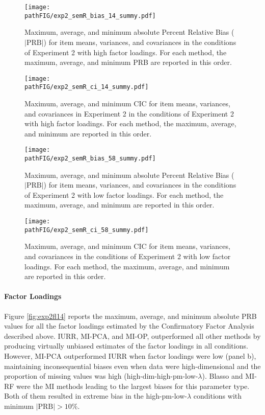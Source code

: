 \begin{figure}
	\texttt{[image: \\pathFIG/exp2\_semR\_bias\_14\_summy.pdf]}
\caption{
	Maximum, average, and minimum absolute Percent Relative Bias ($|\text{PRB}|$) for item means, variances, 
	and covariances in the conditions of Experiment 2 with high factor loadings.
	For each method, the maximum, average, and minimum PRB are reported in this order.	
}
\label{fig:exp2bias14}
\end{figure}

\begin{figure}
	\texttt{[image: \\pathFIG/exp2\_semR\_ci\_14\_summy.pdf]}
\caption{
	Maximum, average, and minimum CIC for item means, variances, and covariances in Experiment 2
	in the conditions of Experiment 2 with high factor loadings.
	For each method, the maximum, average, and minimum are reported in this order.
}
\label{fig:exp2cir14}
\end{figure}

\begin{figure}
	\texttt{[image: \\pathFIG/exp2\_semR\_bias\_58\_summy.pdf]}
\caption{
	Maximum, average, and minimum absolute Percent Relative Bias ($|\text{PRB}|$) for item means, variances, 
	and covariances in the conditions of Experiment 2 with low factor loadings.
	For each method, the maximum, average, and minimum are reported in this order.	
}
\label{fig:exp2bias58}
\end{figure}

\begin{figure}
	\texttt{[image: \\pathFIG/exp2\_semR\_ci\_58\_summy.pdf]}
\caption{
	Maximum, average, and minimum CIC for item means, variances, and covariances in the conditions of 
	Experiment 2 with low factor loadings.
	For each method, the maximum, average, and minimum are reported in this order.
}
\label{fig:exp2cir58}
\end{figure}

\FloatBarrier

	\paragraph{Factor Loadings}
	Figure \ref{fig:exp2fl14} reports the maximum, average, and minimum absolute PRB values for all the factor 
	loadings estimated by the Confirmatory Factor Analysis described above.
	IURR, MI-PCA, and MI-OP, outperformed all other methods by producing virtually unbiased estimates of the 
	factor loadings in all conditions.
	However, MI-PCA outperformed IURR when factor loadings were low (panel b), maintaining inconsequential 
	biases even when data were high-dimensional and the proportion of missing values was high
	(high-dim-high-pm-low-$\lambda$).
	Blasso and MI-RF were the MI methods leading to the largest biases for this parameter type.
	Both of them resulted in extreme bias in the high-pm-low-$\lambda$ conditions with minimum $|\text{PRB}| > 10\%$.

